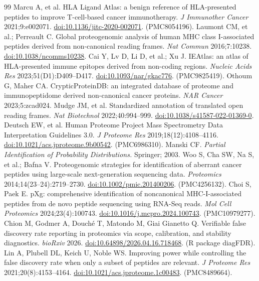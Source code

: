 \begin{thebibliography}{99}
 Marcu A, et al. HLA Ligand Atlas: a benign reference of HLA-presented peptides to improve T-cell-based cancer immunotherapy. \emph{J Immunother Cancer} 2021;9:e002071. \href{https://doi.org/10.1136/jitc-2020-002071}{doi:10.1136/jitc-2020-002071}. (PMC8054196).
 Laumont CM, et al.; Perreault C. Global proteogenomic analysis of human MHC class I-associated peptides derived from non-canonical reading frames. \emph{Nat Commun} 2016;7:10238. \href{https://doi.org/10.1038/ncomms10238}{doi:10.1038/ncomms10238}.
 Cai Y, Lv D, Li D, et al.; Xu J. IEAtlas: an atlas of HLA-presented immune epitopes derived from non-coding regions. \emph{Nucleic Acids Res} 2023;51(D1):D409--D417. \href{https://doi.org/10.1093/nar/gkac776}{doi:10.1093/nar/gkac776}. (PMC9825419).
 Othoum G, Maher CA. CrypticProteinDB: an integrated database of proteome and immunopeptidome derived non-canonical cancer proteins. \emph{NAR Cancer} 2023;5:zcad024.
 Mudge JM, et al. Standardized annotation of translated open reading frames. \emph{Nat Biotechnol} 2022;40:994--999. \href{https://doi.org/10.1038/s41587-022-01369-0}{doi:10.1038/s41587-022-01369-0}.
 Deutsch EW, et al. Human Proteome Project Mass Spectrometry Data Interpretation Guidelines 3.0. \emph{J Proteome Res} 2019;18(12):4108--4116. \href{https://doi.org/10.1021/acs.jproteome.9b00542}{doi:10.1021/acs.jproteome.9b00542}. (PMC6986310).
 Manski CF. \emph{Partial Identification of Probability Distributions.} Springer; 2003.
 Woo S, Cha SW, Na S, et al.; Bafna V. Proteogenomic strategies for identification of aberrant cancer peptides using large-scale next-generation sequencing data. \emph{Proteomics} 2014;14(23--24):2719--2730. \href{https://doi.org/10.1002/pmic.201400206}{doi:10.1002/pmic.201400206}. (PMC4256132).
 Choi S, Paek E. pXg: comprehensive identification of noncanonical MHC-I-associated peptides from de novo peptide sequencing using RNA-Seq reads. \emph{Mol Cell Proteomics} 2024;23(4):100743. \href{https://doi.org/10.1016/j.mcpro.2024.100743}{doi:10.1016/j.mcpro.2024.100743}. (PMC10979277).
 Chion M, Godmer A, Douché T, Matondo M, Giai Gianetto Q. Verifiable false discovery rate reporting in proteomics via scope, calibration, and stability diagnostics. \emph{bioRxiv} 2026. \href{https://doi.org/10.64898/2026.04.16.718468}{doi:10.64898/2026.04.16.718468}. (R package diagFDR).
 Lin A, Plubell DL, Keich U, Noble WS. Improving power while controlling the false discovery rate when only a subset of peptides are relevant. \emph{J Proteome Res} 2021;20(8):4153--4164. \href{https://doi.org/10.1021/acs.jproteome.1c00483}{doi:10.1021/acs.jproteome.1c00483}. (PMC8489664).

\end{thebibliography}
